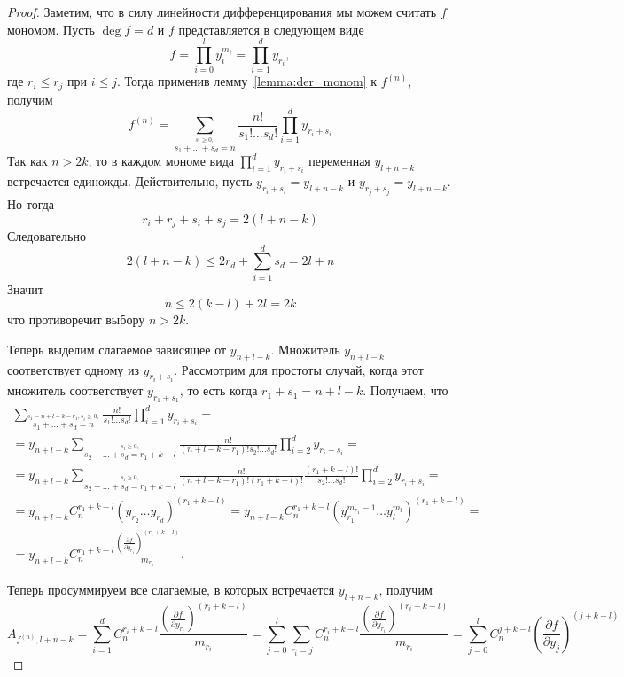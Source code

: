 \documentclass[16pt]{article}
\theoremstyle{plain}
\theoremstyle{definition}
\theoremstyle{remark}
\begin{document}
\begin{proof}
Заметим, что в силу линейности дифференцирования мы можем считать
$f$ мономом. Пусть $\deg f = d$ и $f$ представляется в
следующем виде
$$
f=\prod\limits_{i=0}^ly_i^{m_i}=\prod\limits_{i=1}^{d}y_{r_i},
$$
где $r_i\leqslant r_j$ при $i \leqslant j$. Тогда применив лемму~\ref{lemma:der_monom} к $f^{(n)}$,
получим
$$
f^{(n)}=\sum\limits_{\stackrel{s_i\geqslant0,}{
s_1+\ldots+s_d=n}}\frac{n!}{s_1!\ldots s_d!}
\prod\limits_{i=1}^dy_{r_i+s_i}
$$
Так как $n>2k$, то в каждом мономе вида $\prod_{i=1}^d y_{r_i+s_i}$
переменная $y_{l+n-k}$ встречается единожды. Действительно, пусть
$y_{r_i+s_i}=y_{l+n-k}$ и $y_{r_j+s_j}=y_{l+n-k}$. Но тогда
$$
r_i+r_j +s_i+s_j = 2(l+n-k)
$$
Следовательно
$$
2(l+n-k)\leqslant 2r_d + \sum_{i=1}^d s_d = 2l +n
$$
Значит
$$
n \leqslant 2(k-l) + 2l =2k
$$
что противоречит выбору $n>2k$.


Теперь выделим слагаемое зависящее от $y_{n+l-k}$. Множитель
$y_{n+l-k}$ соответствует одному из $y_{r_i+s_i}$. Рассмотрим для
простоты случай, когда этот множитель соответствует $y_{r_1+s_1}$,
то есть когда $r_1+s_1 = n+l-k$.  Получаем, что
\begin{gather*}
\sum\limits_{\stackrel{s_1 =n+l-k-r_1,
s_i\geqslant0,}{s_1+\ldots+s_d=n}}\frac{n!}{s_1!\ldots s_d!}\prod\limits_{i=1}^dy_{r_i+s_i}=\\
=y_{n+l-k}\sum\limits_{\stackrel{
s_i\geqslant0,}{s_2+\ldots+s_d=r_1+k-l}}\frac{n!}{(n+l-k-r_1)!s_2!\ldots s_d!}\prod\limits_{i=2}^dy_{r_i+s_i}=\\
=y_{n+l-k}\sum\limits_{\stackrel{
s_i\geqslant0,}{s_2+\ldots+s_d=r_1+k-l}}\frac{n!}{(n+l-k-r_1)!(r_1+k-l)!}\frac{(r_1+k-l)!}{s_2!\ldots s_d!}\prod\limits_{i=2}^dy_{r_i+s_i}=\\
=y_{n+l-k}C_n^{r_1+k-l} (y_{r_2}\ldots y_{r_d})^{(r_1+k-l)} =
y_{n+l-k}C_n^{r_1+k-l}(y_{r_1}^{m_{r_1}-1}\ldots
y_{l}^{m_l})^{(r_1+k-l)}=\\
=y_{n+l-k}C_n^{r_1+k-l}\frac{\left(\frac{\partial f}{\partial
y_{r_1}}\right)^{(r_1+k -l)}}{m_{r_1}}.
\end{gather*}

Теперь просуммируем все слагаемые, в которых встречается
$y_{l+n-k}$, получим
$$
A_{f^{(n)},l+n-k} = \sum_{i=1}^{d}
C_n^{r_i+k-l}\frac{\left(\frac{\partial f}{\partial
y_{r_i}}\right)^{(r_i+k -l)}}{m_{r_i}}= \sum_{j=0}^l \sum_{r_i = j}
C_n^{r_i+k-l}\frac{\left(\frac{\partial f}{\partial
y_{r_i}}\right)^{(r_i+k -l)}}{m_{r_i}} = \sum_{j=0}^l C_n^{j+k-l}
\left(\frac{\partial f}{\partial y_{j}}\right)^{(j+k-l)}
$$

\end{proof}
\end{document}
